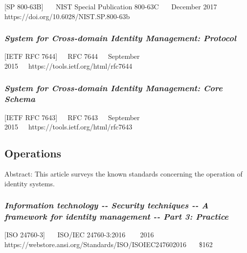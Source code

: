 {[}SP 800-63B{]}~~~ NIST Special Publication 800-63C~~~ December 2017~~~
https://doi.org/10.6028/NIST.SP.800-63b~~~

\hypertarget{system-for-cross-domain-identity-management-protocol}{%
\subsubsection{\texorpdfstring{\emph{System for Cross-domain Identity
Management:
Protocol}}{System for Cross-domain Identity Management: Protocol}}\label{system-for-cross-domain-identity-management-protocol}}

{[}IETF RFC 7644{]}~~~RFC 7644~~~September
2015~~~https://tools.ietf.org/html/rfc7644

\hypertarget{system-for-cross-domain-identity-management-core-schema}{%
\subsubsection{\texorpdfstring{\emph{System for Cross-domain Identity
Management: Core
Schema}}{System for Cross-domain Identity Management: Core Schema}}\label{system-for-cross-domain-identity-management-core-schema}}

{[}IETF RFC 7643{]}~~~RFC 7643~~~September
2015~~~https://tools.ietf.org/html/rfc7643

\hypertarget{operations}{%
\subsection{Operations}\label{operations}}

Abstract: This article surveys the known standards concerning the
operation of identity systems.

\hypertarget{information-technology----security-techniques----a-framework-for-identity-management----part-3-practice}{%
\subsubsection{\texorpdfstring{\emph{Information technology -\/- Security
techniques -\/- A framework for identity management -\/- Part 3:
Practice}}{Information technology -\/- Security techniques -\/- A framework for identity management -\/- Part 3: Practice}}\label{information-technology----security-techniques----a-framework-for-identity-management----part-3-practice}}

{[}ISO 24760-3{]}~~~ ISO/IEC 24760-3:2016 ~~~ 2016~~~
https://webstore.ansi.org/Standards/ISO/ISOIEC247602016~~~ \$162

